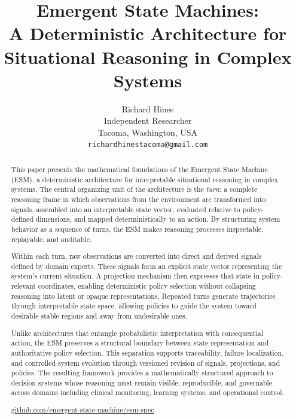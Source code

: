 \documentclass[11pt]{article}
\date{}
\title{Emergent State Machines:\\
A Deterministic Architecture for Situational Reasoning in Complex Systems}
\author{
Richard Hines\\
\small Independent Researcher\\
\small Tacoma, Washington, USA\\
\small \texttt{richardhinestacoma@gmail.com}\\
}
\begin{document}
\maketitle

\begin{abstract}
This paper presents the mathematical foundations of the Emergent State Machine (ESM), a deterministic architecture for interpretable situational reasoning in complex systems. The central organizing unit of the architecture is the \emph{turn}: a complete reasoning frame in which observations from the environment are transformed into signals, assembled into an interpretable state vector, evaluated relative to policy-defined dimensions, and mapped deterministically to an action. By structuring system behavior as a sequence of turns, the ESM makes reasoning processes inspectable, replayable, and auditable.

Within each turn, raw observations are converted into direct and derived signals defined by domain experts. These signals form an explicit state vector representing the system’s current situation. A projection mechanism then expresses that state in policy-relevant coordinates, enabling deterministic policy selection without collapsing reasoning into latent or opaque representations. Repeated turns generate trajectories through interpretable state space, allowing policies to guide the system toward desirable stable regions and away from undesirable ones.

Unlike architectures that entangle probabilistic interpretation with consequential action, the ESM preserves a structural boundary between state representation and authoritative policy selection. This separation supports traceability, failure localization, and controlled system evolution through versioned revision of signals, projections, and policies. The resulting framework provides a mathematically structured approach to decision systems whose reasoning must remain visible, reproducible, and governable across domains including clinical monitoring, learning systems, and operational control.

\href{https://github.com/emergent-state-machine/esm-spec}{github.com/emergent-state-machine/esm-spec}

\end{abstract}
\end{document}

